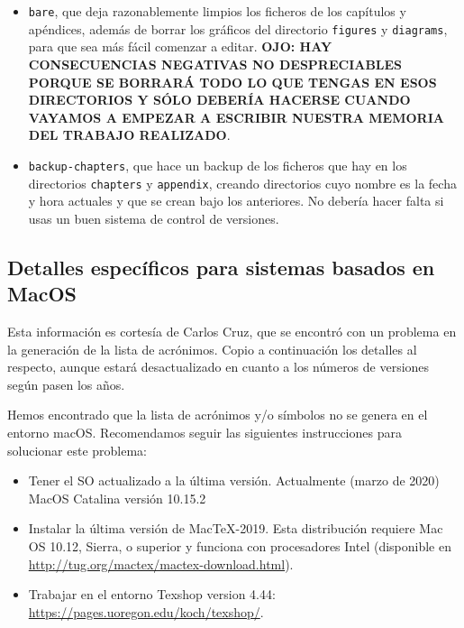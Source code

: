 \begin{itemize}
\begin{itemize}
          \item \texttt{bare}, que deja razonablemente limpios los ficheros de los capítulos y apéndices, además de borrar los gráficos del directorio \texttt{figures} y \texttt{diagrams}, para que sea más fácil comenzar a editar. \textbf{OJO: HAY CONSECUENCIAS NEGATIVAS NO DESPRECIABLES PORQUE SE BORRARÁ TODO LO QUE TENGAS EN ESOS DIRECTORIOS Y SÓLO DEBERÍA HACERSE CUANDO VAYAMOS A EMPEZAR A ESCRIBIR NUESTRA MEMORIA DEL TRABAJO REALIZADO}.

          \item \texttt{backup-chapters}, que hace un backup de los ficheros que hay en los directorios \texttt{chapters} y \texttt{appendix}, creando directorios cuyo nombre es la fecha y hora actuales y que se crean bajo los anteriores. No debería hacer falta si usas un buen sistema de control de versiones.
        \end{itemize}

\end{itemize}


\subsection{Detalles específicos para sistemas basados en MacOS}
\label{sec:detall-espec-para}

Esta información es cortesía de Carlos Cruz, que se encontró con un problema en la generación de la lista de acrónimos. Copio a continuación los detalles al respecto, aunque estará desactualizado en cuanto a los números de versiones según pasen los años.

Hemos encontrado que la lista de acrónimos y/o símbolos no se genera en el entorno macOS. Recomendamos seguir las siguientes instrucciones para solucionar este problema:

\begin{itemize}
  \item Tener el SO actualizado a la última versión. Actualmente (marzo de 2020) MacOS Catalina versión 10.15.2
  \item Instalar la última versión de MacTeX-2019. Esta distribución requiere Mac OS 10.12, Sierra, o superior y funciona con procesadores Intel (disponible en \href{http://tug.org/mactex/mactex-download.html}{http://tug.org/mactex/mactex-download.html}).
  \item Trabajar en el entorno Texshop version 4.44: \href{https://pages.uoregon.edu/koch/texshop/}{https://pages.uoregon.edu/koch/texshop/}.
\end{itemize}

